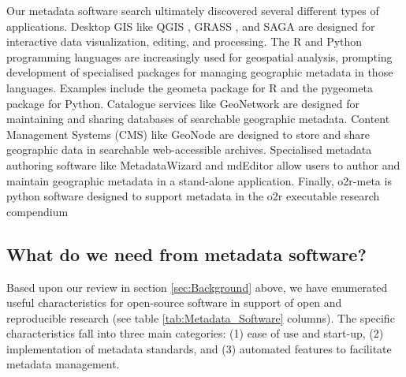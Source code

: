 \documentclass{isprs} %
\begin{document}
Our metadata software search ultimately discovered several different types of applications.
Desktop GIS like QGIS \citep{QGIS2022}, GRASS \citep{grass2020}, and SAGA \citep{gmd-8-1991-2015} are designed for interactive data visualization, editing, and processing.
The R and Python programming languages are increasingly used for geospatial analysis, prompting development of specialised packages for managing geographic metadata in those languages. 
Examples include the geometa package \citep{blondel_2022} for R and the pygeometa package \citep{pygeometa} for Python.
Catalogue services like GeoNetwork \cite{geonetwork} are designed for maintaining and sharing databases of searchable geographic metadata.
Content Management Systems (CMS) like GeoNode \cite{geonode} are designed to store and share geographic data in searchable web-accessible archives.
Specialised metadata authoring software like MetadataWizard \citep{usgs} and mdEditor \citep{ADIwg} allow users to author and maintain geographic metadata in a stand-alone application.
Finally, o2r-meta \citep{nust_daniel_2021_5106499} is python software designed to support metadata in the o2r executable research compendium

\subsection{What do we need from metadata software?}\label{metadataneeds}

Based upon our review in section \ref{sec:Background} above, we have enumerated useful characteristics for open-source software in support of open and reproducible research (see table \ref{tab:Metadata_Software} columns).
The specific characteristics fall into three main categories: (1) ease of use and start-up, (2) implementation of metadata standards, and (3) automated features to facilitate metadata management.
\end{document}
